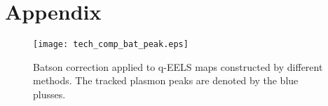 \section*{Appendix}

\begin{figure}[h!]
    \centering
    \texttt{[image: tech\_comp\_bat\_peak.eps]}\caption{Batson correction applied to q-EELS maps constructed by different methods. The tracked plasmon peaks are denoted by the blue plusses.}
    \label{fig:bat-cor-comp}
\end{figure}

